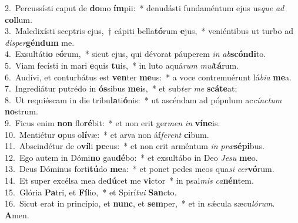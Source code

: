 {2.~}Percussísti caput de \textbf{do}mo \textbf{ím}pii:~* denudásti fundaméntum ejus us\textit{que} \textit{ad} \textbf{col}lum.\\
{3.~}Maledixísti sceptris ejus,~† cápiti bella\textbf{tó}rum \textbf{e}jus,~* veniéntibus ut turbo ad \textit{di}\textit{sper}\textbf{gén}\textbf{dum} me.\\
{4.~}Exsultáti\textbf{o} e\textbf{ó}rum,~* sicut ejus, qui dévorat páuperem \textit{in} \textit{ab}\textbf{scón}\textbf{di}to.\\
{5.~}Viam fecísti in mari \textbf{e}quis \textbf{tu}is,~* in luto aquá\textit{rum} \textit{mul}\textbf{tá}rum.\\
{6.~}Audívi, et conturbátus est \textbf{ven}ter \textbf{me}us:~* a voce contremuérunt lá\textit{bi}\textit{a} \textbf{me}a.\\
{7.~}Ingrediátur putrédo in \textbf{ós}sibus \textbf{me}is,~* et sub\textit{ter} \textit{me} \textbf{scá}\textbf{te}at;\\
{8.~}Ut requiéscam in die tribu\textbf{la}ti\textbf{ó}nis:~* ut ascéndam ad pópulum ac\textit{cín}\textit{ctum} \textbf{no}strum.\\
{9.~}Ficus enim \textbf{non} flo\textbf{ré}bit:~* et non erit ger\textit{men} \textit{in} \textbf{ví}\textbf{ne}is.\\
{10.~}Mentiétur \textbf{o}pus o\textbf{lí}væ:~* et arva non áf\textit{fe}\textit{rent} \textbf{ci}bum.\\
{11.~}Abscindétur de o\textbf{ví}li \textbf{pe}cus:~* et non erit arméntum \textit{in} \textit{præ}\textbf{sé}\textbf{pi}bus.\\
{12.~}Ego autem in Dómi\textbf{no} gau\textbf{dé}bo:~* et exsultábo in Deo \textit{Je}\textit{su} \textbf{me}o.\\
{13.~}Deus Dóminus forti\textbf{tú}do \textbf{me}a:~* et ponet pedes meos qua\textit{si} \textit{cer}\textbf{vó}rum.\\
{14.~}Et super excélsa mea de\textbf{dú}cet me \textbf{vi}ctor~* in psal\textit{mis} \textit{ca}\textbf{nén}tem.\\
{15.~}Glória \textbf{Pa}tri, et \textbf{Fí}lio,~* et Spirí\textit{tu}\textit{i} \textbf{San}cto.\\
{16.~}Sicut erat in princípio, et \textbf{nunc}, et \textbf{sem}per,~* et in sǽcula sæcu\textit{ló}\textit{rum}. \textbf{A}men.\\
